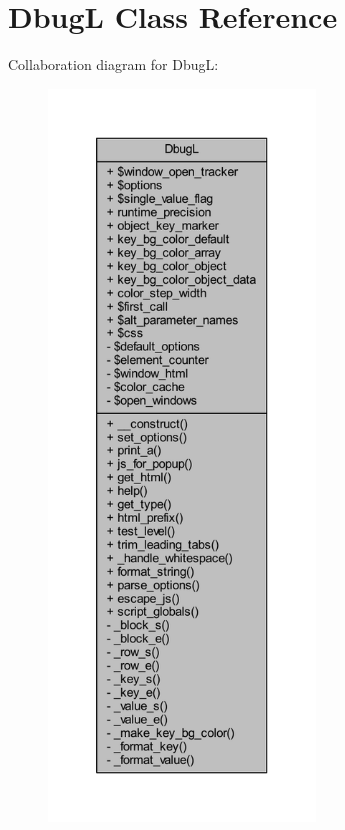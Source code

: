 \hypertarget{class_dbug_l}{}\section{DbugL Class Reference}
\label{class_dbug_l}


Collaboration diagram for DbugL\+:\nopagebreak
\begin{figure}[H]
\begin{center}
\leavevmode
\includegraphics[height=550pt]{class_dbug_l__coll__graph}
\end{center}
\end{figure}
